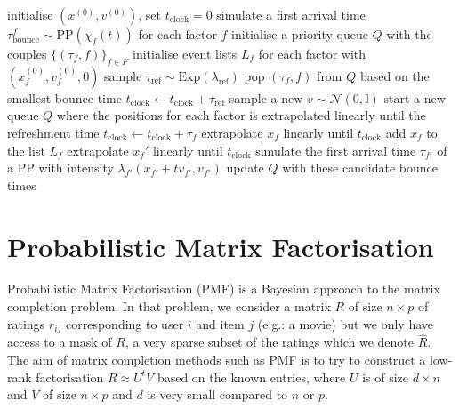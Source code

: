 %
\begin{algorithm}[!h]\small
	\caption{\label{alg:LBPS}\small {}}
	\begin{algorithmic}[1]
	\State initialise $(x^{(0)},v^{(0)})$, set $t_{\text{clock}}=0$
	\State simulate a first arrival time $\tau_{\text{bounce}}^{f}\sim \text{PP}(\chi_{f}(t))$ for each factor $f$
	\State initialise a priority queue $Q$ with the couples $\{(\tau_{f}, f)\}_{f\in F}$
	\State initialise event lists $L_{f}$ for each factor with $(x^{(0)}_{f}, v^{(0)}_{f}, 0)$
	\State sample $\tau_{\text{ref}}\sim\mathrm{Exp}(\lambda_{\text{ref}})$
		\State pop $(\tau_{f}, f)$ from $Q$ based on the smallest bounce time
			\State $t_{\text{clock}}\leftarrow t_{\text{clock}}+\tau_{\text{ref}}$
			\State sample a new $v\sim \mathcal N(0, \mathbb I)$
			\State start a new queue $Q$ where the positions for each factor is extrapolated linearly until the refreshment time
		\Else
			\State $t_{\text{clock}}\leftarrow t_{\text{clock}}+\tau_{f}$
			\State extrapolate $x_{f}$ linearly until $t_{\text{clock}}$
			\State add $x_{f}$ to the list $L_{f}$
				\State extrapolate $x_{f}'$ linearly until $t_{\text{clock}}$
				\State simulate the first arrival time $\tau_{f'}$ of a PP with intensity $\lambda_{f'}(x_{f'}+tv_{f'}, v_{f'})$
				\State update $Q$ with these candidate bounce times
			\EndFor
		\EndIf
	\EndWhile
	\end{algorithmic}
\end{algorithm}



\section{Probabilistic Matrix Factorisation}

Probabilistic Matrix Factorisation (PMF) \citep{mnih08} is a Bayesian approach to the matrix completion problem. In that problem, we consider a matrix $R$ of size $n\times p$ of ratings $r_{ij}$ corresponding to user $i$ and item $j$ (e.g.: a movie) but we only have access to a mask of $R$, a very sparse subset of the ratings which we denote $\hat R$. The aim of matrix completion methods such as PMF is to try to construct a low-rank factorisation  $R\approx U^{t}V$ based on the known entries, where $U$ is of size $d\times n$ and $V$ of size $n\times p$ and $d$ is very small compared to $n$ or $p$. 

